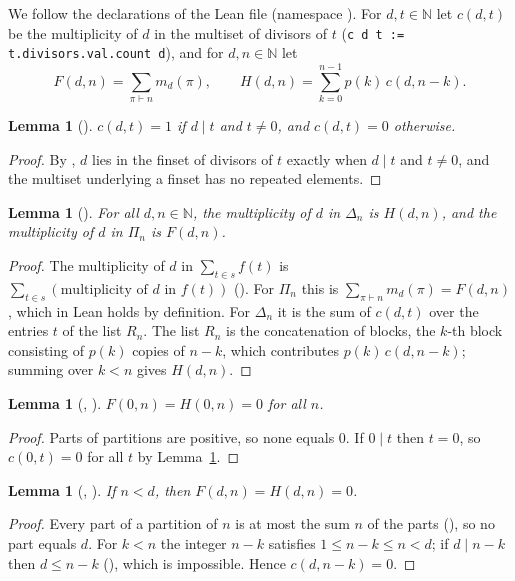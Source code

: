 \documentclass[11pt]{amsart}
\theoremstyle{plain}
\newtheorem{lemma}[theorem]{Lemma}
\theoremstyle{definition}
\newcommand{\N}{\mathbb{N}}
\begin{document}
We follow the declarations of the Lean file (namespace ).
For $d,t\in\N$ let $c(d,t)$ be the multiplicity of $d$ in the multiset of divisors of $t$ (\texttt{c d t := t.divisors.val.count d}), and for $d,n\in\N$ let
\[
  F(d,n)=\sum_{\pi\vdash n}m_d(\pi),\qquad H(d,n)=\sum_{k=0}^{n-1}p(k)\,c(d,n-k).
\]

\begin{lemma}[]\label{lem:c}
$c(d,t)=1$ if $d\mid t$ and $t\neq0$, and $c(d,t)=0$ otherwise.
\end{lemma}

\begin{proof}
By , $d$ lies in the finset of divisors of $t$ exactly when $d\mid t$ and $t\ne0$, and the multiset underlying a finset has no repeated elements.
\end{proof}

\begin{lemma}[]\label{lem:lhs}
For all $d,n\in\N$, the multiplicity of $d$ in $\Delta_n$ is $H(d,n)$, and the multiplicity of $d$ in $\Pi_n$ is $F(d,n)$.
\end{lemma}

\begin{proof}
The multiplicity of $d$ in $\sum_{t\in s}f(t)$ is $\sum_{t\in s}(\text{multiplicity of $d$ in } f(t))$ ().
For $\Pi_n$ this is $\sum_{\pi\vdash n}m_d(\pi)=F(d,n)$, which in Lean holds by definition.
For $\Delta_n$ it is the sum of $c(d,t)$ over the entries $t$ of the list $R_n$. The list $R_n$ is the concatenation of blocks, the $k$-th block consisting of $p(k)$ copies of $n-k$, which contributes $p(k)\,c(d,n-k)$; summing over $k<n$ gives $H(d,n)$.
\end{proof}

\begin{lemma}[, ]\label{lem:zero}
$F(0,n)=H(0,n)=0$ for all $n$.
\end{lemma}

\begin{proof}
Parts of partitions are positive, so none equals $0$. If $0\mid t$ then $t=0$, so $c(0,t)=0$ for all $t$ by Lemma~\ref{lem:c}.
\end{proof}

\begin{lemma}[, ]\label{lem:lt}
If $n<d$, then $F(d,n)=H(d,n)=0$.
\end{lemma}

\begin{proof}
Every part of a partition of $n$ is at most the sum $n$ of the parts (), so no part equals $d$.
For $k<n$ the integer $n-k$ satisfies $1\le n-k\le n<d$; if $d\mid n-k$ then $d\le n-k$ (), which is impossible. Hence $c(d,n-k)=0$.
\end{proof}
\end{document}
